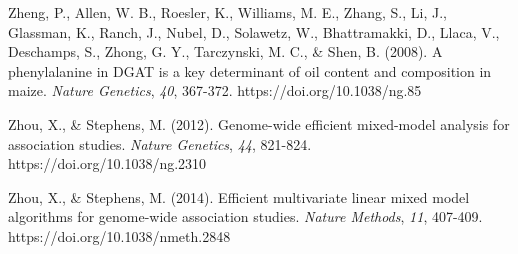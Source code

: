 \documentclass[
]{article}
\begin{document}
Zheng, P., Allen, W. B., Roesler, K., Williams, M. E., Zhang, S., Li,
J., Glassman, K., Ranch, J., Nubel, D., Solawetz, W., Bhattramakki, D.,
Llaca, V., Deschamps, S., Zhong, G. Y., Tarczynski, M. C., \& Shen, B.
(2008). A phenylalanine in DGAT is a key determinant of oil content and
composition in maize. \emph{Nature Genetics}, \emph{40}, 367-372.
https://doi.org/10.1038/ng.85

Zhou, X., \& Stephens, M. (2012). Genome-wide efficient mixed-model
analysis for association studies. \emph{Nature Genetics}, \emph{44},
821-824. https://doi.org/10.1038/ng.2310

Zhou, X., \& Stephens, M. (2014). Efficient multivariate linear mixed
model algorithms for genome-wide association studies. \emph{Nature
Methods}, \emph{11}, 407-409. https://doi.org/10.1038/nmeth.2848
\end{document}

